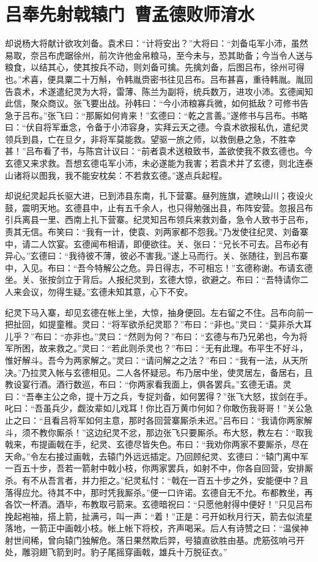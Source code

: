 \chapter{吕奉先射戟辕门~曹孟德败师淯水}

却说杨大将献计欲攻刘备。袁术曰：“计将安出？”大将曰：“刘备屯军小沛，虽然易取，奈吕布虎踞徐州，前次许他金帛粮马，至今未与，恐其助备；今当令人送与粮食，以结其心，使其按兵不动，则刘备可擒。先擒刘备，后图吕布，徐州可得也。”术喜，便具粟二十万斛，令韩胤赍密书往见吕布。吕布甚喜，重待韩胤。胤回告袁术，术遂遣纪灵为大将，雷薄、陈兰为副将，统兵数万，进攻小沛。玄德闻知此信，聚众商议。张飞要出战。孙韩曰：“今小沛粮寡兵微，如何抵敌？可修书告急于吕布。”张飞曰：“那厮如何肯来！”玄德曰：“乾之言善。”遂修书与吕布。书略曰：“伏自将军垂念，令备于小沛容身，实拜云天之德。今袁术欲报私仇，遣纪灵领兵到县，亡在旦夕，非将军莫能救。望驱一旅之师，以救倒悬之急，不胜幸甚！”吕布看了书，与陈宫计议曰：“前者袁术送粮致书，盖欲使我不救玄德也。今玄德又来求救。吾想玄德屯军小沛，未必遂能为我害；若袁术并了玄德，则北连泰山诸将以图我，我不能安枕矣：不若救玄德。”遂点兵起程。

却说纪灵起兵长驱大进，已到沛县东南，扎下营寨。昼列旌旗，遮映山川；夜设火鼓，震明天地。玄德县中，止有五千余人，也只得勉强出县，布阵安营。忽报吕布引兵离县一里、西南上扎下营寨。纪灵知吕布领兵来救刘备，急令人致书于吕布，责其无信。布笑曰：“我有一计，使袁、刘两家都不怨我。”乃发使往纪灵、刘备寨中，请二人饮宴。玄德闻布相请，即便欲往。关、张曰：“兄长不可去。吕布必有异心。”玄德曰：“我待彼不薄，彼必不害我。”遂上马而行。关、张随往，到吕布寨中，入见。布曰：“吾今特解公之危。异日得志，不可相忘！”玄德称谢。布请玄德坐。关、张按剑立于背后。人报纪灵到，玄德大惊，欲避之。布曰：“吾特请你二人来会议，勿得生疑。”玄德未知其意，心下不安。

纪灵下马入寨，却见玄德在帐上坐，大惊，抽身便回。左右留之不住。吕布向前一把扯回，如提童稚。灵曰：“将军欲杀纪灵耶？”布曰：“非也。”灵曰：“莫非杀大耳儿乎？”布曰：“亦非也。”灵曰：“然则为何？”布曰：“玄德与布乃兄弟也，今为将军所困，故来救之。”灵曰：“若此则杀灵也？”布曰：“无有此理。布平生不好斗，惟好解斗。吾今为两家解之。”灵曰：“请问解之之法？”布曰：“我有一法，从天所决。”乃拉灵入帐与玄德相见。二人各怀疑忌。布乃居中坐，使灵居左，备居右，且教设宴行酒。酒行数巡，布曰：“你两家看我面上，俱各罢兵。”玄德无语。灵曰：“吾奉主公之命，提十万之兵，专捉刘备，如何罢得？”张飞大怒，拔剑在手。叱曰：“吾虽兵少，觑汝辈如儿戏耳！你比百万黄巾何如？你敢伤我哥哥！”关公急止之曰：“且看吕将军如何主意，那时各回营寨厮杀未迟。”吕布曰：“我请你两家解斗，须不教你厮杀！”这边纪灵不忿，那边张飞只要厮杀。布大怒，教左右：“取我戟来，布提画戟在手，纪灵、玄德尽皆失色。布曰：“我劝你两家不要厮杀，尽在天命。”令左右接过画戟，去辕门外远远插定。乃回顾纪灵、玄德曰：“辕门离中军一百五十步，吾若一箭射中戟小枝，你两家罢兵，如射不中，你各自回营，安排厮杀。有不从吾言者，并力拒之。”纪灵私忖：“戟在一百五十步之外，安能便中？且落得应允。待其不中，那时凭我厮杀。”便一口许诺。玄德自无不允。布都教坐，再各饮一杯酒。酒毕，布教取弓箭来。玄德暗祝曰：“只愿他射得中便好！”只见吕布挽起袍袖，搭上箭，扯满弓，叫一声：“着！”正是：弓开如秋月行天，箭去似流星落地，一箭正中画戟小枝。帐上帐下将校，齐声喝采。后人有诗赞之曰：“温侯神射世间稀，曾向辕门独解危。落日果然欺后羿，号猿直欲胜由基。虎筋弦响弓开处，雕羽翅飞箭到时。豹子尾摇穿画戟，雄兵十万脱征衣。”

